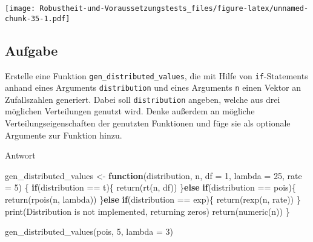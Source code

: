 \documentclass[
]{book}
\newenvironment{Shaded}{\begin{snugshade}}{\end{snugshade}}
\newcommand{\AttributeTok}[1]{\textcolor[rgb]{0.77,0.63,0.00}{#1}}
\newcommand{\ControlFlowTok}[1]{\textcolor[rgb]{0.13,0.29,0.53}{\textbf{#1}}}
\newcommand{\DecValTok}[1]{\textcolor[rgb]{0.00,0.00,0.81}{#1}}
\newcommand{\FunctionTok}[1]{\textcolor[rgb]{0.00,0.00,0.00}{#1}}
\newcommand{\NormalTok}[1]{#1}
\newcommand{\OtherTok}[1]{\textcolor[rgb]{0.56,0.35,0.01}{#1}}
\newcommand{\SpecialCharTok}[1]{\textcolor[rgb]{0.00,0.00,0.00}{#1}}
\newcommand{\StringTok}[1]{\textcolor[rgb]{0.31,0.60,0.02}{#1}}
\begin{document}
\texttt{[image: Robustheit-und-Voraussetzungstests\_files/figure-latex/unnamed-chunk-35-1.pdf]}

\hypertarget{aufgabe-3}{%
\subsection{Aufgabe}\label{aufgabe-3}}

Erstelle eine Funktion \texttt{gen\_distributed\_values}, die mit Hilfe von \texttt{if}-Statements anhand eines Arguments \texttt{distribution} und eines Arguments \texttt{n} einen Vektor an Zufallszahlen generiert. Dabei soll \texttt{distribution} angeben, welche aus drei möglichen Verteilungen genutzt wird. Denke außerdem an mögliche Verteilungseigenschaften der genutzten Funktionen und füge sie als optionale Argumente zur Funktion hinzu.

Antwort

\begin{Shaded}
\begin{Highlighting}[]
\NormalTok{gen\_distributed\_values }\OtherTok{\textless{}{-}} \ControlFlowTok{function}\NormalTok{(distribution,}
\NormalTok{                                   n,}
                                   \AttributeTok{df =} \DecValTok{1}\NormalTok{,}
                                   \AttributeTok{lambda =} \DecValTok{25}\NormalTok{,}
                                   \AttributeTok{rate =} \DecValTok{5}\NormalTok{) \{}
  \ControlFlowTok{if}\NormalTok{(distribution }\SpecialCharTok{==} \StringTok{\textquotesingle{}t\textquotesingle{}}\NormalTok{)\{}
    \FunctionTok{return}\NormalTok{(}\FunctionTok{rt}\NormalTok{(n, df))}
\NormalTok{  \}}\ControlFlowTok{else} \ControlFlowTok{if}\NormalTok{(distribution }\SpecialCharTok{==} \StringTok{\textquotesingle{}pois\textquotesingle{}}\NormalTok{)\{}
    \FunctionTok{return}\NormalTok{(}\FunctionTok{rpois}\NormalTok{(n, lambda))}
\NormalTok{  \}}\ControlFlowTok{else} \ControlFlowTok{if}\NormalTok{(distribution }\SpecialCharTok{==} \StringTok{\textquotesingle{}exp\textquotesingle{}}\NormalTok{)\{}
    \FunctionTok{return}\NormalTok{(}\FunctionTok{rexp}\NormalTok{(n, rate))}
\NormalTok{  \}}
  \FunctionTok{print}\NormalTok{(}\StringTok{\textquotesingle{}Distribution is not implemented, returning zeros\textquotesingle{}}\NormalTok{)}
  \FunctionTok{return}\NormalTok{(}\FunctionTok{numeric}\NormalTok{(n))}
\NormalTok{\}}

\FunctionTok{gen\_distributed\_values}\NormalTok{(}\StringTok{\textquotesingle{}pois\textquotesingle{}}\NormalTok{,}
                       \DecValTok{5}\NormalTok{,}
                       \AttributeTok{lambda =} \DecValTok{3}\NormalTok{)}
\end{Highlighting}
\end{Shaded}
\end{document}
